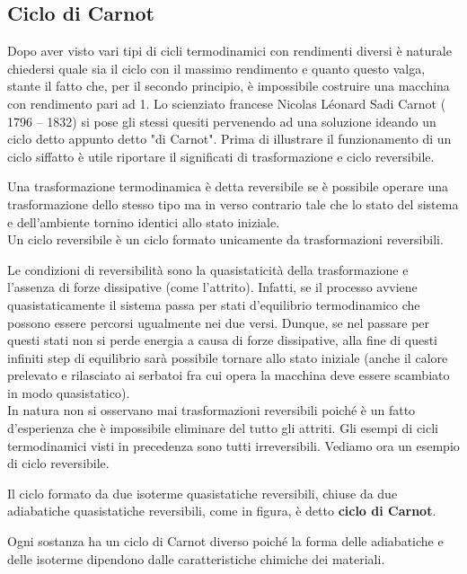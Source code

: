 \documentclass[
10pt, %
a4paper, %
oneside, %
headinclude,footinclude, %
BCOR5mm, %
]{scrartcl}
\begin{document}
\subsection{Ciclo di Carnot}
Dopo aver visto vari tipi di cicli termodinamici con rendimenti diversi è naturale chiedersi quale sia il ciclo con il massimo rendimento e quanto questo valga, stante il fatto che, per il secondo principio, è impossibile costruire una macchina con rendimento pari ad 1. Lo scienziato francese Nicolas Léonard Sadi Carnot ( 1796 – 1832) si pose gli stessi quesiti pervenendo ad una soluzione ideando un ciclo detto appunto detto "di Carnot". Prima di illustrare il funzionamento di un ciclo siffatto è utile riportare il significati di trasformazione e ciclo reversibile.
\begin{definition}
	Una trasformazione termodinamica è detta reversibile se è possibile operare una trasformazione dello stesso tipo ma in verso contrario tale che lo stato del sistema e dell'ambiente tornino identici allo stato iniziale. \\
	Un ciclo reversibile è un ciclo formato unicamente da trasformazioni reversibili.
\end{definition}
Le condizioni di reversibilità sono la quasistaticità della trasformazione e l'assenza di forze dissipative (come l'attrito). Infatti, se il processo avviene quasistaticamente il sistema passa per stati d'equilibrio termodinamico che possono essere percorsi ugualmente nei due versi. Dunque, se nel passare per questi stati non si perde energia a causa di forze dissipative, alla fine di questi infiniti step di equilibrio sarà possibile tornare allo stato iniziale (anche il calore prelevato e rilasciato ai serbatoi fra cui opera la macchina deve essere scambiato in modo quasistatico).\\
In natura non si osservano mai trasformazioni reversibili poiché è un fatto d'esperienza che è impossibile eliminare del tutto gli attriti.  Gli esempi di cicli termodinamici visti in precedenza sono tutti irreversibili. Vediamo ora un esempio di ciclo reversibile.
\begin{definition}
	Il ciclo formato da due isoterme quasistatiche reversibili, chiuse da due adiabatiche quasistatiche reversibili, come in figura, è detto \textbf{ciclo di Carnot}.
\end{definition} 
Ogni sostanza ha un ciclo di Carnot diverso poiché la forma delle adiabatiche e delle isoterme dipendono dalle caratteristiche chimiche dei materiali. 
\end{document}

